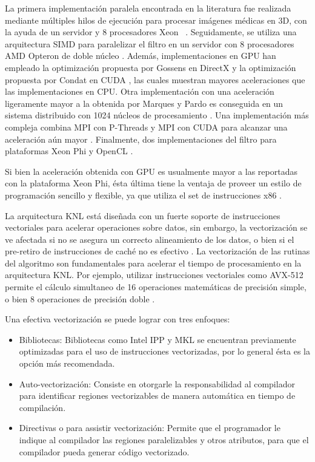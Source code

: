 La primera implementación paralela encontrada en la literatura fue realizada mediante múltiples hilos de ejecución para procesar imágenes médicas en 3D, con la ayuda de un servidor y 8 procesadores Xeon \ \cite{coupe2006fast}. Seguidamente, se utiliza una arquitectura SIMD para paralelizar el filtro en un servidor con 8 procesadores AMD Opteron de doble núcleo \cite{Darbon2008}. Además, implementaciones en GPU han empleado la optimización propuesta por Gossens en DirectX \cite{marques2013implementation} y la optimización propuesta por Condat en CUDA \cite{mingliang2016medical,goossens2010gpu}, las cuales muestran mayores aceleraciones que las implementaciones en CPU. Otra implementación con una aceleración ligeramente mayor a la obtenida por Marques y Pardo \cite{marques2013implementation} es conseguida en un sistema distribuido con 1024 núcleos de procesamiento \cite{shi2015optimized}. Una implementación más compleja combina MPI con P-Threads y MPI con CUDA para alcanzar una aceleración aún mayor \cite{nguyen2016medical}. Finalmente, dos implementaciones del filtro para plataformas Xeon Phi \cite{zhu2016parallel,huang2017parallel} y OpenCL \cite{zhu2016parallel}.

Si bien la aceleración obtenida con GPU es usualmente mayor a las reportadas con la plataforma Xeon Phi, ésta última tiene la ventaja de proveer un estilo de programación sencillo y flexible, ya que utiliza el set de instrucciones x86 \cite{huang2017parallel}. 

La arquitectura KNL está dise\~nada con un fuerte soporte de instrucciones vectoriales para acelerar operaciones sobre datos, sin embargo,  la vectorización se ve afectada si no se asegura un correcto alineamiento de los datos, o bien si el pre-retiro de instrucciones de caché no es efectivo \cite{Jeffers201617:vect}.
La vectorización de las rutinas del algoritmo son fundamentales para acelerar el tiempo de procesamiento en la arquitectura KNL. Por ejemplo, utilizar instrucciones vectoriales como AVX-512 permite el cálculo simultaneo de 16 operaciones matemáticas de precisión simple, o bien 8 operaciones de precisión doble \cite{Jeffers201617:vect}.

Una efectiva vectorización se puede lograr con tres enfoques:

\begin{itemize}
\item Bibliotecas: Bibliotecas como Intel IPP y MKL se encuentran previamente optimizadas para el uso de instrucciones vectorizadas, por lo general \'esta es la opci\'on m\'as recomendada. 
\item Auto-vectorización: Consiste en otorgarle la responsabilidad al compilador para identificar regiones vectorizables de manera autom\'atica en tiempo de compilaci\'on.
\item Directivas o  para assistir vectorización: Permite que el programador le indique al compilador las regiones paralelizables y otros atributos, para que el compilador pueda generar c\'odigo vectorizado.
\end{itemize}
 
